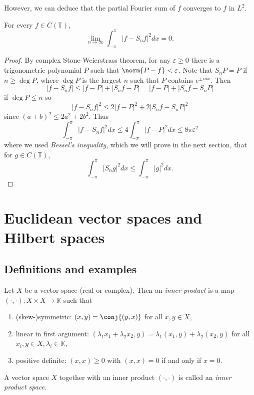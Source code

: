 \documentclass[a4paper]{article}
\newcommand{\K}{{\mathbb{K}}} %
\begin{document}
However, we can deduce that the partial Fourier sum of \(f\) converges to \(f\) in \(L^2\).

\begin{proposition}
  For every \(f \in C(\mathbb T)\),
  \[
    \lim_{n \to \infty} \int_{-\pi}^\pi |f - S_nf|^2 dx = 0.
  \]
\end{proposition}

\begin{proof}
  By complex Stone-Weierstrass theorem, for any \(\varepsilon \geq 0\) there is a trigonometric polynomial \(P\) such that \(\norm{P - f} < \varepsilon\). Note that \(S_nP = P\) if \(n \geq \deg P\), where \(\deg P\) is the largest \(n\) such that \(P\) contains \(e^{\pm inx}\). Then
  \[
    |f - S_nf| \leq |f - P| + |S_nf - P| = |f - P| + |S_nf - S_n P|
  \]
  if \(\deg P \leq n\) so
  \[
    |f - S_nf|^2 \leq 2 |f - P|^2 + 2 |S_nf - S_nP|^2
  \]
  since \((a + b)^2 \leq 2a^2 + 2b^2\). Thus
  \[
    \int_{-\pi}^\pi |f - S_nf|^2 dx
    \leq 4 \int_{-\pi}^\pi |f - P|^2 dx
    \leq 8\pi \varepsilon^2
   \]
   where we used \emph{Bessel's inequality}, which we will prove in the next section, that for \(g \in C(\mathbb T)\),
   \[
     \int_{-\pi}^\pi |S_ng|^2 dx \leq \int_{-\pi}^\pi |g|^2 dx.
   \]
\end{proof}

\section{Euclidean vector spaces and Hilbert spaces}

\subsection{Definitions and examples}

\begin{definition}
  Let \(X\) be a vector space (real or complex). Then an \emph{inner product} is a map \((\cdot, \cdot): X \times X \to \K\) such that
  \begin{enumerate}
  \item (skew-)symmetric: \((x, y) = \conj{(y, x)}\) for all \(x, y \in X\),
  \item linear in first argument: \((\lambda_1x_1 + \lambda_2x_2, y) = \lambda_1(x_1, y) + \lambda_2(x_2, y)\) for all \(x_i, y \in X, \lambda_i \in \K\),
  \item positive definite: \((x, x) \geq 0\) with \((x, x) = 0\) if and only if \(x = 0\).
  \end{enumerate}

  A vector space \(X\) together with an inner product \((\cdot, \cdot)\) is called an \emph{inner product space}.
\end{definition}
\end{document}
